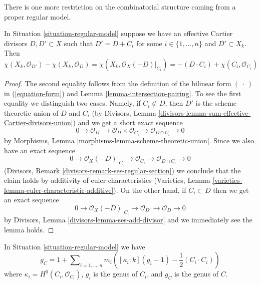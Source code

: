 \noindent
There is one more restriction on the combinatorial structure
coming from a proper regular model.

\begin{lemma}
\label{lemma-add-component}
In Situation \ref{situation-regular-model} suppose we have an
effective Cartier divisors $D, D' \subset X$ such that
$D' = D + C_i$ for some $i \in \{1, \ldots, n\}$ and $D' \subset X_k$.
Then
$$
\chi(X_k, \mathcal{O}_{D'}) - \chi(X_k, \mathcal{O}_D) =
\chi(X_k, \mathcal{O}_X(-D)|_{C_i}) =
-(D \cdot C_i) + \chi(C_i, \mathcal{O}_{C_i})
$$
\end{lemma}

\begin{proof}
The second equality follows from the definition of the bilinear form
$(\ \cdot\ )$ in (\ref{equation-form}) and
Lemma \ref{lemma-intersection-pairing}. To see the first
equality we distinguish two cases.
Namely, if $C_i \not \subset D$, then $D'$ is the scheme
theoretic union of $D$ and $C_i$ (by
Divisors, Lemma \ref{divisors-lemma-sum-effective-Cartier-divisors-union})
and we get a short exact sequence
$$
0 \to \mathcal{O}_{D'} \to
\mathcal{O}_D \times \mathcal{O}_{C_i} \to
\mathcal{O}_{D \cap C_i} \to 0
$$
by Morphisms, Lemma \ref{morphisms-lemma-scheme-theoretic-union}.
Since we also have an exact sequence
$$
0 \to \mathcal{O}_X(-D)|_{C_i} \to
\mathcal{O}_{C_i} \to \mathcal{O}_{D \cap C_i} \to 0
$$
(Divisors, Remark \ref{divisors-remark-ses-regular-section})
we conclude that the claim holds
by additivity of euler characteristics
(Varieties, Lemma \ref{varieties-lemma-euler-characteristic-additive}).
On the other hand, if $C_i \subset D$ then we get an
exact sequence
$$
0 \to \mathcal{O}_X(-D)|_{C_i} \to \mathcal{O}_{D'} \to \mathcal{O}_D \to 0
$$
by Divisors, Lemma \ref{divisors-lemma-ses-add-divisor}
and we immediately see the lemma holds.
\end{proof}

\begin{lemma}
\label{lemma-genus-formula}
In Situation \ref{situation-regular-model} we have
$$
g_C = 1 + \sum\nolimits_{i = 1, \ldots, n}
m_i\left([\kappa_i : k] (g_i - 1) - \frac{1}{2}(C_i \cdot C_i)\right)
$$
where $\kappa_i = H^0(C_i, \mathcal{O}_{C_i})$,
$g_i$ is the genus of $C_i$, and $g_C$ is the genus of $C$.
\end{lemma}

